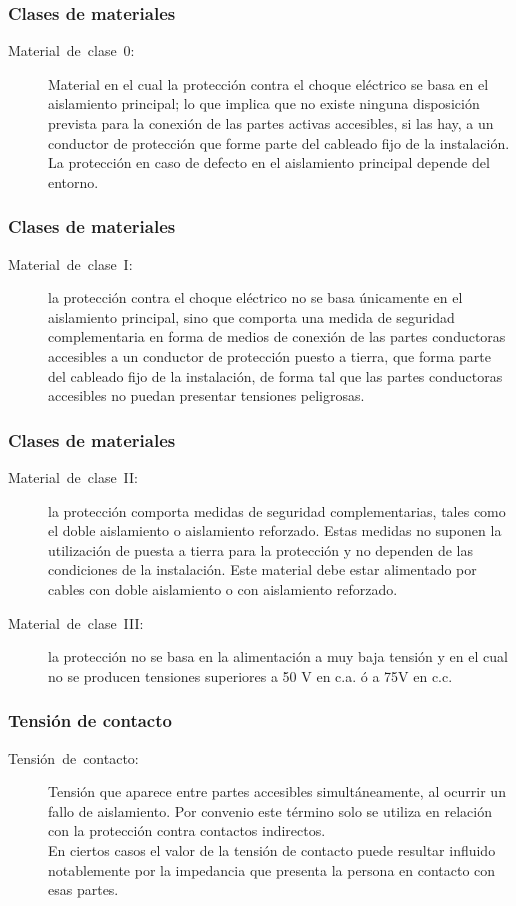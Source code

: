 \documentclass[serif, xcolor=dvipsnames]{beamer}
\begin{document}
\begin{frame}
\frametitle{Clases de materiales}
\begin{description}
\item [{Material~de~clase~0:}] Material en el cual la protección contra
el choque eléctrico se basa en el aislamiento principal; lo que implica
que no existe ninguna disposición prevista para la conexión de las
partes activas accesibles, si las hay, a un conductor de protección
que forme parte del cableado fijo de la instalación. La protección
en caso de defecto en el aislamiento principal depende del entorno.
\end{description}

\end{frame}

\begin{frame}
\frametitle{Clases de materiales}
\begin{description}
\item [{Material~de~clase~I:}] la protección contra el choque eléctrico
no se basa únicamente en el aislamiento principal, sino que comporta
una medida de seguridad complementaria en forma de medios de conexión
de las partes conductoras accesibles a un conductor de protección
puesto a tierra, que forma parte del cableado fijo de la instalación,
de forma tal que las partes conductoras accesibles no puedan presentar
tensiones peligrosas.
\end{description}

\end{frame}

\begin{frame}
\frametitle{Clases de materiales}
\begin{description}
\item [{Material~de~clase~II:}] la protección comporta medidas de seguridad
complementarias, tales como el doble aislamiento o aislamiento reforzado.
Estas medidas no suponen la utilización de puesta a tierra para la
protección y no dependen de las condiciones de la instalación. Este
material debe estar alimentado por cables con doble aislamiento o
con aislamiento reforzado.
\item [{Material~de~clase~III:}] la protección no se basa en la alimentación
a muy baja tensión y en el cual no se producen tensiones superiores
a 50 V en c.a. ó a 75V en c.c.
\end{description}

\end{frame}

\begin{frame}
\frametitle{Tensión de contacto }
\begin{description}
\item [{Tensión~de~contacto:}] Tensión que aparece entre partes accesibles
simultáneamente, al ocurrir un fallo de aislamiento. Por convenio
este término solo se utiliza en relación con la protección contra
contactos indirectos. \\
En ciertos casos el valor de la tensión de contacto puede resultar
influido notablemente por la impedancia que presenta la persona en
contacto con esas partes.
\end{description}

\end{frame}
\end{document}
